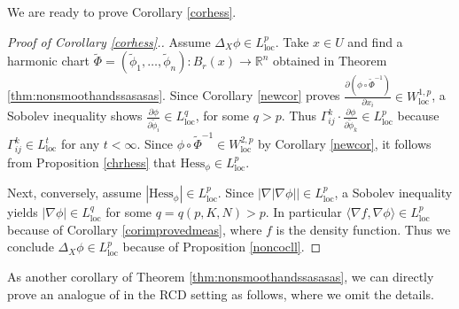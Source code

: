 \documentclass[11pt,reqno]{amsart}
\theoremstyle{definition}
\numberwithin{equation}{section}
\DeclareMathOperator{\loc}{loc}
\begin{document}
We are ready to prove Corollary \ref{corhess}.
\begin{proof}[Proof of Corollary \ref{corhess}.]
Assume $\Delta_X \phi \in L^p_{\loc}$. Take $x \in U$ and find a harmonic chart $\tilde \Phi=(\tilde \phi_1, \ldots, \tilde \phi_n):B_r(x) \to \mathbb{R}^n$  obtained in Theorem \ref{thm:nonsmoothandssasasas}. Since Corollary \ref{newcor} proves $\frac{\partial (\phi\circ \tilde \Phi^{-1})}{\partial x_i} \in W^{1,p}_{\loc}$, a Sobolev inequality shows $\frac{\partial \phi}{\partial \tilde \phi_i} \in L^{q}_{\loc}$, for some $q>p$. Thus $\Gamma_{ij}^k\cdot \frac{\partial \phi}{\partial \tilde{\phi}_k}\in L^{p}_{\loc}$ because $\Gamma_{ij}^k \in L^{t}_{\loc}$ for any $t<\infty$. Since  $\phi \circ \tilde \Phi^{-1} \in W^{2,p}_{\loc}$ by Corollary \ref{newcor}, it follows from Proposition \ref{chrhess} that $\mathrm{Hess}_{\phi} \in L^p_{\loc}$.

Next, conversely, assume $|\mathrm{Hess}_{\phi}| \in L^p_{\loc}$. Since $|\nabla|\nabla \phi|| \in L^{p}_{\loc}$, a Sobolev inequality \cite{HK} yields $|\nabla \phi| \in L^q_{\loc}$ for some $q=q(p, K, N)>p$. In particular $\langle \nabla f, \nabla \phi\rangle \in L^p_{\loc}$ because of Corollary \ref{corimprovedmeas}, where $f$ is the density function. Thus we conclude $\Delta_X \phi \in L^p_{\loc}$ because of Proposition \ref{noncocll}. 
\end{proof}

As another corollary of Theorem \ref{thm:nonsmoothandssasasas}, 
we can directly prove an analogue of \cite[Theorems 0.1 and 0.2]{AC} in the RCD setting as follows, where we omit the details. 
\end{document}
